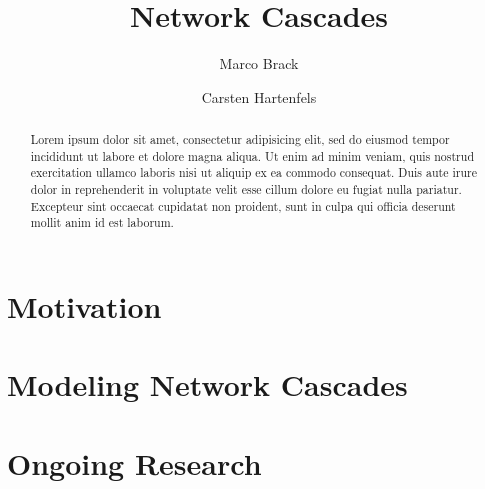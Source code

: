 \documentclass{sig-alternate-05-2015}
\begin{document}
\title{Network Cascades}
\author{Marco Brack \and Carsten Hartenfels}
\maketitle

\begin{abstract}
  Lorem ipsum dolor sit amet, consectetur adipisicing elit, sed do eiusmod tempor incididunt ut labore et dolore magna aliqua. Ut enim ad minim veniam, quis nostrud exercitation ullamco laboris nisi ut aliquip ex ea commodo consequat. Duis aute irure dolor in reprehenderit in voluptate velit esse cillum dolore eu fugiat nulla pariatur. Excepteur sint occaecat cupidatat non proident, sunt in culpa qui officia deserunt mollit anim id est laborum. \cite{simplemodel}
\end{abstract}

\section{Motivation}

\section{Modeling Network Cascades}

\section{Ongoing Research}



\end{document}
